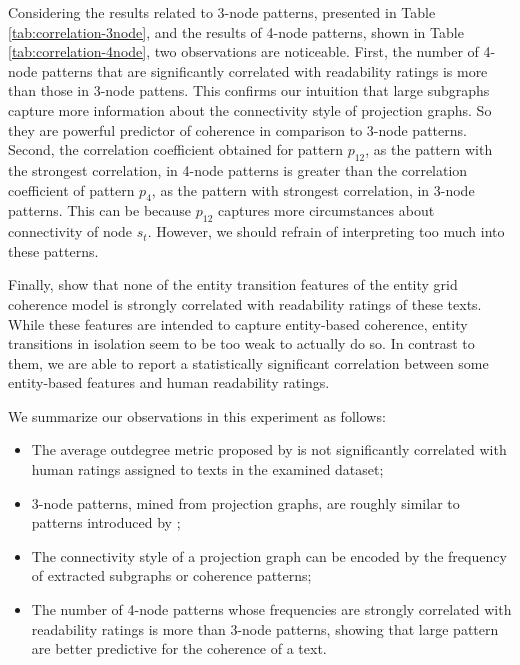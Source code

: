 Considering the results related to 3-node patterns, presented in Table \ref{tab:correlation-3node}, and the results of 4-node patterns, shown in Table \ref{tab:correlation-4node}, two observations are noticeable.
First, the number of 4-node patterns that are significantly correlated with readability ratings is more than those in 3-node pattens. 
This confirms our intuition that large subgraphs capture more information about the connectivity style of projection graphs. 
So they are powerful predictor of coherence in comparison to 3-node patterns.  
Second, the correlation coefficient obtained for pattern $p_{12}$, as the pattern with the strongest correlation, in 4-node patterns is greater than the correlation coefficient of pattern $p_4$, as the pattern with strongest correlation, in 3-node patterns. 
This can be because $p_{12}$ captures more circumstances about connectivity of node $s_t$. 
However, we should refrain of interpreting too much into these patterns. 

Finally,  show that none of the entity transition features of the entity grid coherence model is strongly correlated with readability ratings of these texts. 
While these features are intended to capture entity-based coherence, entity transitions in isolation seem to be too weak to actually do so. 
In contrast to them, we are able to report a statistically significant correlation between some entity-based features and human readability ratings.

We summarize our observations in this experiment as follows: 

\begin{itemize}

	\item The average outdegree metric proposed by  is not significantly correlated with human ratings assigned to texts in the examined dataset;

	\item 3-node patterns, mined from projection graphs, are roughly similar to patterns introduced by ;

	\item The connectivity style of a projection graph can be encoded by the frequency of extracted subgraphs or coherence patterns; 

	\item The number of 4-node patterns whose frequencies are strongly correlated with readability ratings is more than 3-node patterns, showing that large pattern are better predictive for the coherence of a text.

\end{itemize}



